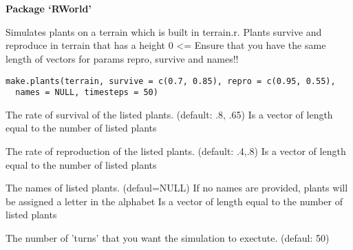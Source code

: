 \documentclass[letterpaper]{book}
\begin{document}
\chapter*{}
\begin{center}
{\textbf{\huge Package `RWorld'}}
\par\bigskip{\large \today}
\end{center}
\begin{description}
\raggedright{}
\item[Type]
\item[Title]
\item[Version]
\item[Date]
\item[Author]
\item[Maintainer]\AsIs{}
\item[Description]
\item[License]
\item[RoxygenNote]
\end{description}
%
\begin{Description}\relax
Simulates plants on a terrain which is built in
terrain.r. Plants survive and reproduce in terrain that has a height 0 <= 
Ensure that you have the same length of vectors for params repro, survive and names!!
\end{Description}
%
\begin{Usage}
\begin{verbatim}
make.plants(terrain, survive = c(0.7, 0.85), repro = c(0.95, 0.55),
  names = NULL, timesteps = 50)
\end{verbatim}
\end{Usage}
%
\begin{Arguments}
\begin{ldescription}
\item[\code{survive}] The rate of survival of the listed plants. (default: .8, .65)
Is a vector of length equal to the number of listed plants

\item[\code{repro}] The rate of reproduction of the listed plants. (default: .4,.8)
Is a vector of length equal to the number of listed plants

\item[\code{names}] The names of listed plants. (defaul=NULL)
If no names are provided, plants will be assigned a letter in the alphabet 
Is a vector of length equal to the number of listed plants

\item[\code{timesteps}] The number of 'turns' that you want the simulation to exectute. (defaul: 50)
\end{ldescription}
\end{Arguments}
\end{document}
